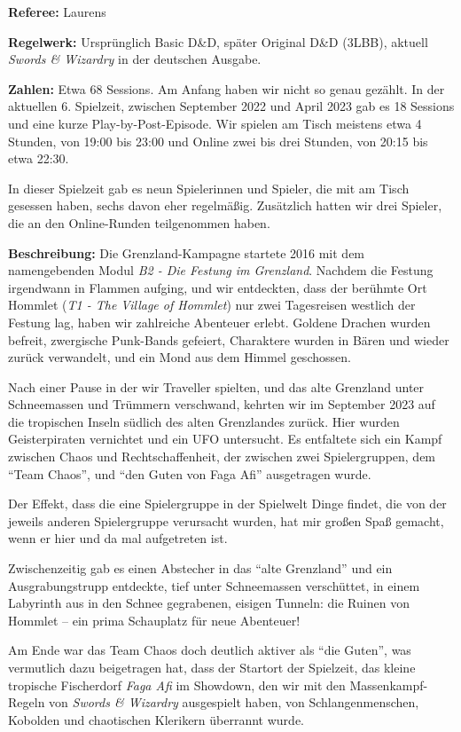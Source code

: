 \documentclass[11pt]{wbzine}
\begin{document}
\begin{multicols}{2}
\textbf{Referee:} Laurens

\textbf{Regelwerk:} Ursprünglich Basic D\&D, später Original D\&D
(3LBB),
aktuell \textit{Swords \& Wizardry} in der deutschen Ausgabe.

\textbf{Zahlen:} Etwa 68 Sessions. Am Anfang haben wir nicht so
genau gezählt. In der aktuellen 6. Spielzeit, zwischen September
2022 und April 2023 gab es 18 Sessions und eine kurze
Play-by-Post-Episode. Wir spielen am Tisch meistens etwa 4 Stunden,
von 19:00 bis 23:00 und Online zwei bis drei Stunden, von 20:15 bis
etwa 22:30.

In dieser Spielzeit gab es neun Spielerinnen und Spieler, die mit am
Tisch gesessen haben, sechs davon eher regelmäßig. Zusätzlich
hatten wir drei Spieler, die an den Online-Runden teilgenommen
haben.

\textbf{Beschreibung:} Die Grenzland-Kampagne startete 2016 mit dem
namengebenden Modul \textit{B2 - Die Festung im Grenzland}. Nachdem
die Festung irgendwann in Flammen aufging, und wir entdeckten, dass
der berühmte Ort Hommlet (\textit{T1 - The Village of Hommlet}) nur
zwei Tagesreisen westlich der Festung lag, haben wir zahlreiche
Abenteuer erlebt. Goldene Drachen wurden befreit, zwergische
Punk-Bands gefeiert, Charaktere wurden in Bären und wieder zurück
verwandelt, und ein Mond aus dem Himmel geschossen.

Nach einer Pause in der wir Traveller spielten, und das alte
Grenzland unter Schneemassen und Trümmern verschwand, kehrten wir im
September 2023 auf die tropischen Inseln südlich des alten
Grenzlandes zurück. Hier wurden Geisterpiraten vernichtet und ein
UFO untersucht. Es entfaltete sich ein Kampf zwischen Chaos und
Rechtschaffenheit, der zwischen zwei Spielergruppen, dem ``Team
Chaos'', und ``den Guten von Faga Afi'' ausgetragen wurde. 

Der Effekt, dass die eine Spielergruppe in der Spielwelt Dinge
findet, die von der jeweils anderen Spielergruppe verursacht wurden,
hat mir großen Spaß gemacht, wenn er hier und da mal aufgetreten
ist.

Zwischenzeitig gab es einen Abstecher in das ``alte Grenzland'' und
ein Ausgrabungstrupp entdeckte, tief unter Schneemassen verschüttet,
in einem Labyrinth aus in den Schnee gegrabenen, eisigen Tunneln:
die Ruinen von Hommlet -- ein prima Schauplatz für neue Abenteuer!

Am Ende war das Team Chaos doch deutlich aktiver als ``die
Guten'', was vermutlich dazu beigetragen hat, dass der Startort
der Spielzeit, das kleine tropische Fischerdorf \textit{Faga Afi} im
Showdown, den wir mit den Massenkampf-Regeln von \textit{Swords \&
Wizardry} ausgespielt haben, von Schlangenmenschen, Kobolden und 
chaotischen Klerikern überrannt wurde.


\end{multicols}
\end{document}
